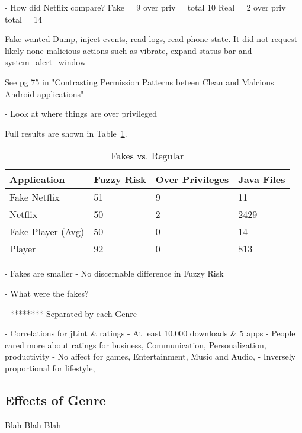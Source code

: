\documentclass{sig-alternate}
\begin{document}
- How did Netflix compare?
Fake = 9 over priv = total 10
Real = 2 over priv = total = 14


Fake wanted Dump, inject events, read logs, read phone state. It did not request likely none malicious actions such as vibrate, expand status bar and system\_alert\_window

See pg 75 in "Contrasting Permission Patterns beteen Clean and Malcious Android applications"


- Look at where things are over privileged

Full results are shown in Table~\ref{Table:fakesvsRegular}.



\begin{center}

\begin{table}[ht]
\caption{Fakes vs. Regular}
\label{Table:fakesvsRegular}
  \begin{tabular}{ l | l | l | l }

    \bfseries Application  & \bfseries Fuzzy Risk  & \bfseries Over Privileges & \bfseries Java Files \\ \hline
    Fake Netflix & 51 & 9 & 11 \\ \hline
    Netflix & 50 & 2 & 2429 \\ \hline \hline
    Fake Player (Avg) & 50 & 0 & 14 \\ \hline
    Player & 92 & 0 & 813 \\ 
  \end{tabular}
\end{table}
\end{center}




- Fakes are smaller
- No discernable difference in Fuzzy Risk


- What were the fakes?



- ******** Separated by each Genre

- Correlations for jLint \& ratings
-		At least 10,000 downloads \& 5 apps
-	People cared more about ratings for business, Communication, Personalization, productivity
-	No affect for games, Entertainment,  Music and Audio, 
- 	Inversely proportional for lifestyle, 


\subsection{Effects of Genre}
Blah Blah Blah
\end{document}
